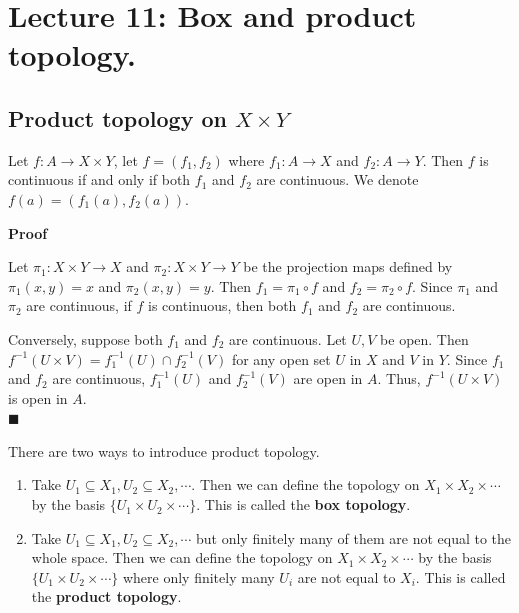 \documentclass[main.tex]{subfiles}
\begin{document}
\pagestyle{plain}
\setcounter{chapter}{10}

\chapter{Lecture 11: Box and product topology. }
\label{chap:chapter11}

\section{Product topology on $X\times Y$} 
\begin{theorem}
    Let $f: A \rightarrow X\times Y$, let $f=(f_1,f_2)$ where $f_1: A \rightarrow X$ and $f_2: A \rightarrow Y$. Then $f$ is continuous if and only if both $f_1$ and $f_2$ are continuous. We denote $f(a) = (f_1(a), f_2(a))$. 
\end{theorem}
\par \noindent \textbf{Proof} 
\par Let $\pi_1: X\times Y \rightarrow X$ and $\pi_2: X\times Y \rightarrow Y$ be the projection maps defined by $\pi_1(x,y) = x$ and $\pi_2(x,y) = y$. Then $f_1 = \pi_1 \circ f$ and $f_2 = \pi_2 \circ f$. Since $\pi_1$ and $\pi_2$ are continuous, if $f$ is continuous, then both $f_1$ and $f_2$ are continuous. 
\par Conversely, suppose both $f_1$ and $f_2$ are continuous. Let $U, V$ be open. Then $f^{-1}(U\times V) = f_1^{-1}(U) \cap f_2^{-1}(V)$ for any open set $U$ in $X$ and $V$ in $Y$. Since $f_1$ and $f_2$ are continuous, $f_1^{-1}(U)$ and $f_2^{-1}(V)$ are open in $A$. Thus, $f^{-1}(U\times V)$ is open in $A$. 
\mbox{} \\ \null \hfill $\blacksquare$ 

\par There are two ways to introduce product topology. 
\begin{enumerate}
    \item Take $U_1 \subseteq X_1, U_2 \subseteq X_2, \cdots$. Then we can define the topology on $X_1 \times X_2 \times \cdots$ by the basis $\{U_1 \times U_2 \times \cdots \}$. This is called the \textbf{box topology}.
    \item Take $U_1 \subseteq X_1, U_2 \subseteq X_2, \cdots$ but only finitely many of them are not equal to the whole space. Then we can define the topology on $X_1 \times X_2 \times \cdots$ by the basis $\{U_1 \times U_2 \times \cdots \}$ where only finitely many $U_i$ are not equal to $X_i$. This is called the \textbf{product topology}. 
\end{enumerate}
\end{document}
